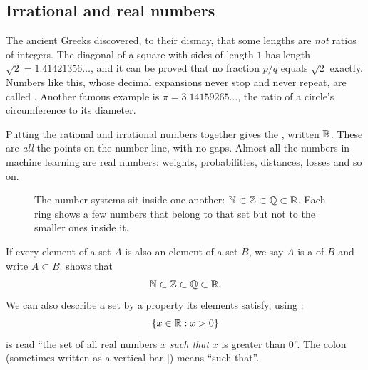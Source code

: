 \subsection{Irrational and real numbers}

The ancient Greeks discovered, to their dismay, that some lengths are
\emph{not} ratios of integers. The diagonal of a square with sides of length
$1$ has length $\sqrt{2} = 1.41421356\ldots$, and it can be proved that no
fraction $p/q$ equals $\sqrt2$ exactly. Numbers like this, whose decimal
expansions never stop and never repeat, are called
. Another famous example is
$\pi = 3.14159265\ldots$, the ratio of a circle's circumference to its
diameter.

Putting the rational and irrational numbers together gives the
, written $\mathbb{R}$. These are \emph{all} the points
on the number line, with no gaps. Almost all the numbers in machine learning
are real numbers: weights, probabilities, distances, losses and so on.

\begin{figure}[htbp]
\centering
{}
\caption{The number systems sit inside one another:
  $\mathbb{N} \subset \mathbb{Z} \subset \mathbb{Q} \subset \mathbb{R}$. Each ring shows a few numbers that
  belong to that set but not to the smaller ones inside it.}
\label{fig:nested-sets}
\end{figure}

\begin{notation}
If every element of a set $A$ is also an element of a set $B$, we say $A$ is a
 of $B$ and write $A \subset B$.  shows that
\[
  \mathbb{N} \subset \mathbb{Z} \subset \mathbb{Q} \subset \mathbb{R} .
\]
We can also describe a set by a property its elements satisfy, using
:
\[
  \{x \in \mathbb{R} : x > 0\}
\]
is read ``the set of all real numbers $x$ \emph{such that} $x$ is greater than
$0$''. The colon (sometimes written as a vertical bar $\mid$) means ``such
that''.
\end{notation}

